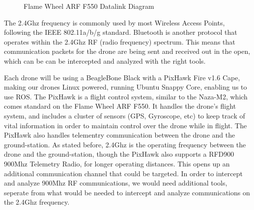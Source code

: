 \documentclass[IEEEtran,letterpaper,10pt,titlepage,draftclsnofoot,onecolumn]{article}
\begin{document}
\begin{figure}[h]
  \caption{Flame Wheel ARF F550 Datalink Diagram}
  \label{fig:datalink_diagram}
\end{figure}

The 2.4Ghz frequency is commonly used by most Wireless Access Points, following the IEEE 802.11a/b/g
standard. Bluetooth is another protocol that operates within the 2.4Ghz RF (radio frequency)
spectrum\cite{HakDaSpectrum}. This means that communication packets for the drone are being sent and received out in the
open, which can be can be intercepted and analyzed with the right tools.

Each drone will be using a BeagleBone Black with a PixHawk Fire v1.6 Cape, making our drones Linux powered, running
Ubuntu Snappy Core, enabling us to use ROS\cite{PixHawk}. The PixHawk is a flight control system, similar to the
Naza-M2, which comes standard on the Flame Wheel ARF F550. It handles the drone's flight system, and includes a cluster
of sensors (GPS, Gyroscope, etc) to keep track of vital information in order to maintain control over the drone while
in flight. The PixHawk also handles telementry communication between the drone and the ground-station. As stated before,
2.4Ghz is the operating frequency between the drone and the ground-station, though the PixHawk also supports a RFD900
900Mhz Telemetry Radio, for longer operating distances\cite{PixHawkDocs}. This opens up an additional communication
channel that could be targeted. In order to intercept and analyze 900Mhz RF communications, we would need additional
tools, seperate from what would be needed to intercept and analyze communications on the 2.4Ghz
frequency\cite{HakDaSpectrum900}.
\end{document}
